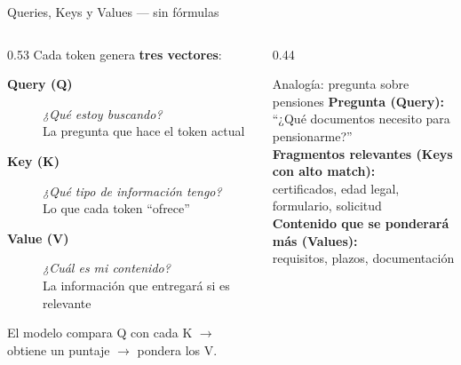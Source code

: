 \documentclass[aspectratio=169, 10pt]{beamer}
\newcommand{\concept}[1]{\textcolor{fenblue}{\textbf{#1}}}
\begin{document}

\begin{frame}{Queries, Keys y Values --- sin fórmulas}

  \begin{columns}[T]
    \begin{column}{0.53\textwidth}
      Cada token genera \textbf{tres vectores}:
      \vspace{0.4em}
      \begin{description}
        \item[\concept{Query (Q)}] \textit{¿Qué estoy buscando?}\\
          La pregunta que hace el token actual
        \item[\concept{Key (K)}] \textit{¿Qué tipo de información tengo?}\\
          Lo que cada token ``ofrece''
        \item[\concept{Value (V)}] \textit{¿Cuál es mi contenido?}\\
          La información que entregará si es relevante
      \end{description}
      \vspace{0.4em}
      El modelo compara Q con cada K $\rightarrow$ obtiene un puntaje $\rightarrow$ pondera los V.
    \end{column}
    \begin{column}{0.44\textwidth}
      \begin{exampleblock}{Analogía: pregunta sobre pensiones}
        \textbf{Pregunta (Query):}\\
        ``¿Qué documentos necesito para pensionarme?''\\[0.3em]
        \textbf{Fragmentos relevantes (Keys con alto match):}\\
        {\small certificados, edad legal, formulario, solicitud}\\[0.3em]
        \textbf{Contenido que se ponderará más (Values):}\\
        {\small requisitos, plazos, documentación}
      \end{exampleblock}
    \end{column}
  \end{columns}

\end{frame}

\end{document}
